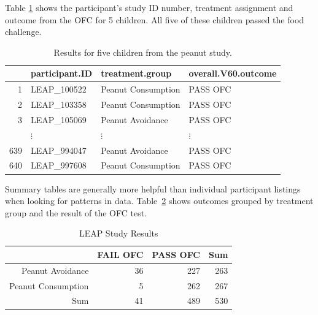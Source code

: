 \begin{doublespace}
Table \ref{peanutStudyResultsDF} shows the participant's study ID number, treatment assignment and outcome from the OFC for 5 children.  All five of these children passed the food challenge.

\begin{table}[ht]
\centering
\begin{tabular}{rlll}
  \hline
 & participant.ID & treatment.group & overall.V60.outcome \\ 
  \hline
1 & LEAP\_100522 & Peanut Consumption & PASS OFC \\ 
  2 & LEAP\_103358 & Peanut Consumption & PASS OFC \\ 
  3 & LEAP\_105069 & Peanut Avoidance & PASS OFC \\ 
& $\vdots$	&	$\vdots$	  &	$\vdots$  \\
  639 & LEAP\_994047 & Peanut Avoidance & PASS OFC \\ 
  640 & LEAP\_997608 & Peanut Consumption & PASS OFC \\ 
   \hline
\end{tabular}

\caption{Results for five children from the peanut study.}
\label{peanutStudyResultsDF}

\end{table}



Summary tables are generally more helpful than individual participant listings  when looking for patterns in data. Table~\ref{peanutStudyResults} shows outcomes grouped by treatment group and the result of the OFC test.

\begin{table}[ht]
\centering
\begin{tabular}{rrrr}
  \hline
 & FAIL OFC & PASS OFC & Sum \\ 
  \hline
Peanut Avoidance & 36 & 227 & 263 \\ 
  Peanut Consumption & 5 & 262 & 267 \\ 
  Sum & 41 & 489 & 530 \\ 
   \hline
\end{tabular}
\caption{LEAP Study Results} 
\label{peanutStudyResults}
\end{table}


\end{doublespace}
